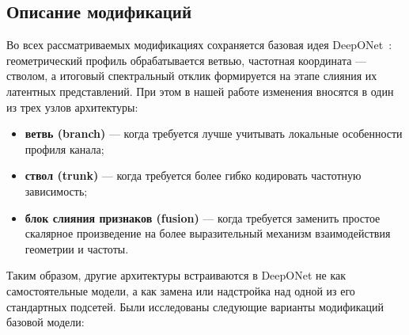 \subsection{Описание модификаций}
\label{subsec:modifications_description}

Во всех рассматриваемых модификациях сохраняется базовая идея DeepONet~\cite{lu2021learning}: геометрический профиль обрабатывается ветвью, частотная координата --- стволом, а итоговый спектральный отклик формируется на этапе слияния их латентных представлений. При этом в нашей работе изменения вносятся в один из трех узлов архитектуры:
\begin{itemize}
    \item \textbf{ветвь (branch)} --- когда требуется лучше учитывать локальные особенности профиля канала;
    \item \textbf{ствол (trunk)} --- когда требуется более гибко кодировать частотную зависимость;
    \item \textbf{блок слияния признаков (fusion)} --- когда требуется заменить простое скалярное произведение на более выразительный механизм взаимодействия геометрии и частоты.
\end{itemize}

Таким образом, другие архитектуры встраиваются в DeepONet не как самостоятельные модели, а как замена или надстройка над одной из его стандартных подсетей. Были исследованы следующие варианты модификаций базовой модели:

